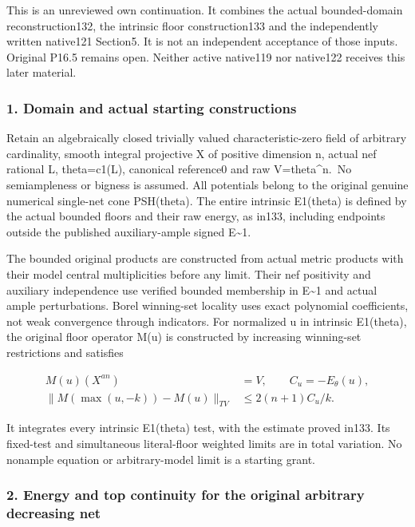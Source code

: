 \documentclass[
]{article}
\begin{document}
This is an unreviewed own continuation. It combines the actual
bounded-domain reconstruction132, the intrinsic floor construction133
and the independently written native121 Section5. It is not an
independent acceptance of those inputs. Original P16.5 remains open.
Neither active native119 nor native122 receives this later material.

\subsubsection{1. Domain and actual starting
constructions}\label{domain-and-actual-starting-constructions}

Retain an algebraically closed trivially valued characteristic-zero
field of arbitrary cardinality, smooth integral projective X of positive
dimension n, actual nef rational L, theta=c1(L), canonical reference0
and raw V=theta\^{}n.~No semiampleness or bigness is assumed. All
potentials belong to the original genuine numerical single-net cone
PSH(theta). The entire intrinsic E1(theta) is defined by the actual
bounded floors and their raw energy, as in133, including endpoints
outside the published auxiliary-ample signed E\textasciitilde1.

The bounded original products are constructed from actual metric
products with their model central multiplicities before any limit. Their
nef positivity and auxiliary independence use verified bounded
membership in E\textasciitilde1 and actual ample perturbations. Borel
winning-set locality uses exact polynomial coefficients, not weak
convergence through indicators. For normalized u in intrinsic E1(theta),
the original floor operator M(u) is constructed by increasing
winning-set restrictions and satisfies

\[\begin{aligned}
 M(u)(X^{an})&=V,\qquad C_u=-E_\theta(u),\\
 \|M(\max(u,-k))-M(u)\|_{TV}&\le 2(n+1)C_u/k.
\end{aligned}\]

It integrates every intrinsic E1(theta) test, with the estimate proved
in133. Its fixed-test and simultaneous literal-floor weighted limits are
in total variation. No nonample equation or arbitrary-model limit is a
starting grant.

\subsubsection{2. Energy and top continuity for the original arbitrary
decreasing
net}\label{energy-and-top-continuity-for-the-original-arbitrary-decreasing-net}
\end{document}
